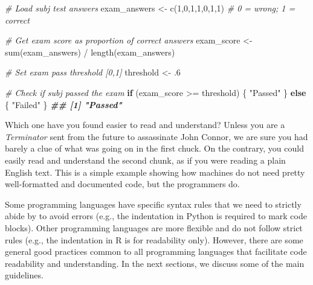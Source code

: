 \documentclass[
  11pt,
]{book}
\newenvironment{Shaded}{\begin{snugshade}}{\end{snugshade}}
\newcommand{\CommentTok}[1]{\textcolor[rgb]{0.56,0.35,0.01}{\textit{#1}}}
\newcommand{\ControlFlowTok}[1]{\textcolor[rgb]{0.13,0.29,0.53}{\textbf{#1}}}
\newcommand{\DecValTok}[1]{\textcolor[rgb]{0.00,0.00,0.81}{#1}}
\newcommand{\DocumentationTok}[1]{\textcolor[rgb]{0.56,0.35,0.01}{\textbf{\textit{#1}}}}
\newcommand{\FunctionTok}[1]{\textcolor[rgb]{0.00,0.00,0.00}{#1}}
\newcommand{\NormalTok}[1]{#1}
\newcommand{\OtherTok}[1]{\textcolor[rgb]{0.56,0.35,0.01}{#1}}
\newcommand{\SpecialCharTok}[1]{\textcolor[rgb]{0.00,0.00,0.00}{#1}}
\newcommand{\StringTok}[1]{\textcolor[rgb]{0.31,0.60,0.02}{#1}}
\newenvironment{code-tex-good}
  {\begingroup\definecolor{shadecolor}{RGB}{224, 240, 227}}
  {\endgroup}
\begin{document}
\begin{code-tex-good}

\begin{Shaded}
\begin{Highlighting}[]
\CommentTok{\# Load subj test answers}
\NormalTok{exam\_answers }\OtherTok{\textless{}{-}} \FunctionTok{c}\NormalTok{(}\DecValTok{1}\NormalTok{,}\DecValTok{0}\NormalTok{,}\DecValTok{1}\NormalTok{,}\DecValTok{1}\NormalTok{,}\DecValTok{0}\NormalTok{,}\DecValTok{1}\NormalTok{,}\DecValTok{1}\NormalTok{) }\CommentTok{\# 0 = wrong; 1 = correct}

\CommentTok{\# Get exam score as proportion of correct answers}
\NormalTok{exam\_score }\OtherTok{\textless{}{-}} \FunctionTok{sum}\NormalTok{(exam\_answers) }\SpecialCharTok{/} \FunctionTok{length}\NormalTok{(exam\_answers)}

\CommentTok{\# Set exam pass threshold [0,1]}
\NormalTok{threshold }\OtherTok{\textless{}{-}}\NormalTok{ .}\DecValTok{6}

\CommentTok{\# Check if subj passed the exam}
\ControlFlowTok{if}\NormalTok{ (exam\_score }\SpecialCharTok{\textgreater{}=}\NormalTok{ threshold) \{}
  \StringTok{"Passed"}
\NormalTok{\} }\ControlFlowTok{else}\NormalTok{ \{}
  \StringTok{"Failed"}
\NormalTok{\}}
\DocumentationTok{\#\# [1] "Passed"}
\end{Highlighting}
\end{Shaded}

\end{code-tex-good}

Which one have you found easier to read and understand? Unless you are a \emph{Terminator} sent from the future to assassinate John Connor, we are sure you had barely a clue of what was going on in the first chuck. On the contrary, you could easily read and understand the second chunk, as if you were reading a plain English text. This is a simple example showing how machines do not need pretty well-formatted and documented code, but the programmers do.

Some programming languages have specific syntax rules that we need to strictly abide by to avoid errors (e.g., the indentation in Python is required to mark code blocks). Other programming languages are more flexible and do not follow strict rules (e.g., the indentation in R is for readability only). However, there are some general good practices common to all programming languages that facilitate code readability and understanding. In the next sections, we discuss some of the main guidelines.
\end{document}
